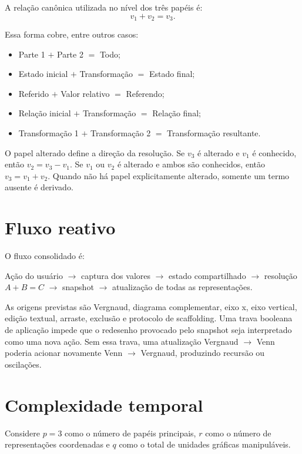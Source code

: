\documentclass[12pt,a4paper]{article}
\begin{document}
A relação canônica utilizada no nível dos três papéis é:
\[
v_1 + v_2 = v_3.
\]

Essa forma cobre, entre outros casos:
\begin{itemize}[noitemsep]
  \item Parte 1 $+$ Parte 2 $=$ Todo;
  \item Estado inicial $+$ Transformação $=$ Estado final;
  \item Referido $+$ Valor relativo $=$ Referendo;
  \item Relação inicial $+$ Transformação $=$ Relação final;
  \item Transformação 1 $+$ Transformação 2 $=$ Transformação resultante.
\end{itemize}

O papel alterado define a direção da resolução. Se $v_3$ é alterado e $v_1$ é conhecido, então $v_2=v_3-v_1$. Se $v_1$ ou $v_2$ é alterado e ambos são conhecidos, então $v_3=v_1+v_2$. Quando não há papel explicitamente alterado, somente um termo ausente é derivado.

\section{Fluxo reativo}

O fluxo consolidado é:

\begin{center}
Ação do usuário $\rightarrow$ captura dos valores $\rightarrow$ estado compartilhado $\rightarrow$ resolução $A+B=C$ $\rightarrow$ snapshot $\rightarrow$ atualização de todas as representações.
\end{center}

As origens previstas são Vergnaud, diagrama complementar, eixo x, eixo vertical, edição textual, arraste, exclusão e protocolo de scaffolding. Uma trava booleana de aplicação impede que o redesenho provocado pelo snapshot seja interpretado como uma nova ação. Sem essa trava, uma atualização Vergnaud $\rightarrow$ Venn poderia acionar novamente Venn $\rightarrow$ Vergnaud, produzindo recursão ou oscilações.

\section{Complexidade temporal}

Considere $p=3$ como o número de papéis principais, $r$ como o número de representações coordenadas e $q$ como o total de unidades gráficas manipuláveis.
\end{document}
